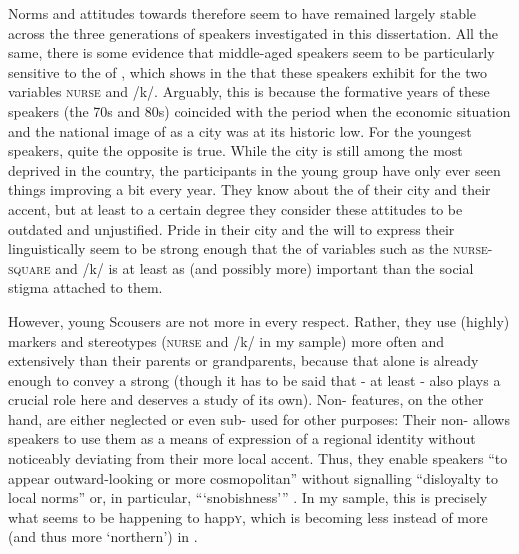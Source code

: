 Norms and attitudes towards  therefore seem to have remained largely stable across the three generations of speakers investigated in this dissertation.
All the same, there is some evidence that middle-aged speakers seem to be particularly sensitive to the  of , which shows in the  that these speakers exhibit for the two  variables \textsc{nurse} and /k/.
Arguably, this is because the formative years of these speakers (the 70s and 80s) coincided with the period when the economic situation and the national image of  as a city was at its historic low.
For the youngest speakers, quite the opposite is true.
While the city is still among the most deprived in the country, the participants in the young group have only ever seen things improving a bit every year.
They know about the  of their city and their accent, but at least to a certain degree they consider these attitudes to be outdated and unjustified.
Pride in their city and the will to express their  linguistically seem to be strong enough that the   of variables such as the \textsc{nurse}-\textsc{square}  and /k/  is at least as (and possibly more) important than the social stigma attached to them.

However, young Scousers are not more  in every respect.
Rather, they use (highly)  markers and stereotypes (\textsc{nurse} and /k/  in my sample) more often and extensively than their parents or grandparents, because that alone is already enough to convey a strong  (though it has to be said that  -  at least - also plays a crucial role here and deserves a study of its own).
Non- features, on the other hand, are either neglected or even sub- used for other purposes: Their non- allows speakers to use them as a means of expression of a regional identity without noticeably deviating from their more local accent.
Thus, they enable speakers ``to appear outward-looking or more cosmopolitan'' without signalling ``disloyalty to local norms'' or, in particular, ``{}`snobishness'{}'' \parencite[13--14]{foulkesdocherty1999a}.
In my sample, this is precisely what seems to be happening to happ\textsc{y}, which is becoming less instead of more  (and thus more `northern') in .


